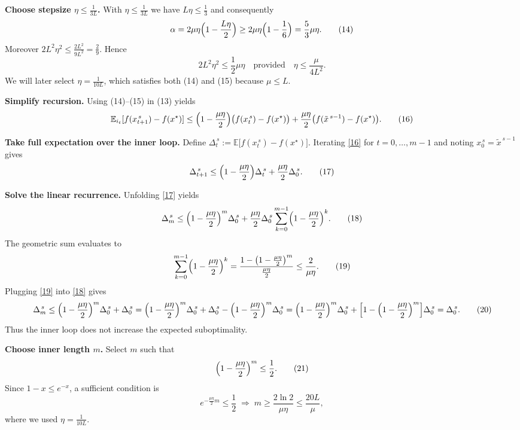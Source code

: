 \documentclass[11pt]{article}
\begin{document}
\begin{enumerate}[label={[\textbf{Step \arabic*}]}]
\item \textbf{Choose stepsize $\eta\le\frac{1}{3L}$.}  
With $\eta\le\frac{1}{3L}$ we have $L\eta\le\frac13$ and consequently
\[
\alpha =2\mu\eta\Bigl(1-\frac{L\eta}{2}\Bigr)\ge 2\mu\eta\Bigl(1-\frac{1}{6}\Bigr)=\frac{5}{3}\mu\eta .
\tag{14}
\]
Moreover $2L^{2}\eta^{2}\le \frac{2L^{2}}{9L^{2}}=\frac{2}{9}$. Hence
\[
2L^{2}\eta^{2}\le \frac{1}{2}\mu\eta
\quad\text{provided}\quad \eta\le\frac{\mu}{4L^{2}}.
\tag{15}
\]
We will later select $\eta=\frac{1}{10L}$, which satisfies both (14) and (15) because $\mu\le L$.

\item \textbf{Simplify recursion.}  
Using (14)–(15) in (13) yields
\[
\mathbb{E}_{i_t}[f(x_{t+1}^{\,s})-f(x^\star)]
\le\Bigl(1-\frac{\mu\eta}{2}\Bigr)\bigl(f(x_t^{\,s})-f(x^\star)\bigr)
+\frac{\mu\eta}{2}\bigl(f(\tilde{x}^{\,s-1})-f(x^\star)\bigr).
\tag{16}
\]

\item \textbf{Take full expectation over the inner loop.}  
Define $\Delta_t^{\,s}:=\mathbb{E}\bigl[f(x_t^{\,s})-f(x^\star)\bigr]$.  
Iterating \eqref{16} for $t=0,\dots,m-1$ and noting $x_0^{\,s}=\tilde{x}^{\,s-1}$ gives
\[
\Delta_{t+1}^{\,s}\le\Bigl(1-\frac{\mu\eta}{2}\Bigr)\Delta_t^{\,s}
+\frac{\mu\eta}{2}\Delta_0^{\,s}.
\tag{17}
\]

\item \textbf{Solve the linear recurrence.}  
Unfolding \eqref{17} yields
\[
\Delta_{m}^{\,s}
\le\Bigl(1-\frac{\mu\eta}{2}\Bigr)^{m}\Delta_0^{\,s}
+\frac{\mu\eta}{2}\Delta_0^{\,s}\sum_{k=0}^{m-1}\Bigl(1-\frac{\mu\eta}{2}\Bigr)^{k}.
\tag{18}
\]
The geometric sum evaluates to
\[
\sum_{k=0}^{m-1}\Bigl(1-\frac{\mu\eta}{2}\Bigr)^{k}
= \frac{1-\bigl(1-\frac{\mu\eta}{2}\bigr)^{m}}{\frac{\mu\eta}{2}}
\le \frac{2}{\mu\eta}.
\tag{19}
\]
Plugging \eqref{19} into \eqref{18} gives
\[
\Delta_{m}^{\,s}\le\Bigl(1-\frac{\mu\eta}{2}\Bigr)^{m}\Delta_0^{\,s}
+ \Delta_0^{\,s}
= \Bigl(1-\frac{\mu\eta}{2}\Bigr)^{m}\Delta_0^{\,s}
+ \Delta_0^{\,s}
- \Bigl(1-\frac{\mu\eta}{2}\Bigr)^{m}\Delta_0^{\,s}
= \Bigl(1-\frac{\mu\eta}{2}\Bigr)^{m}\Delta_0^{\,s}
+ \Bigl[1-\Bigl(1-\frac{\mu\eta}{2}\Bigr)^{m}\Bigr]\Delta_0^{\,s}
= \Delta_0^{\,s}.
\tag{20}
\]
Thus the inner loop does not increase the expected suboptimality.

\item \textbf{Choose inner length $m$.}  
Select $m$ such that
\[
\Bigl(1-\frac{\mu\eta}{2}\Bigr)^{m}\le\frac{1}{2}.
\tag{21}
\]
Since $1-x\le e^{-x}$, a sufficient condition is
\[
e^{-\frac{\mu\eta}{2}m}\le\frac12\;\Longrightarrow\;
m\ge\frac{2\ln 2}{\mu\eta}\le\frac{20L}{\mu},
\]
where we used $\eta=\frac{1}{10L}$.


\end{enumerate}
\end{document}
